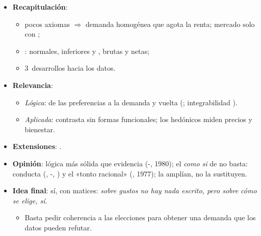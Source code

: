\documentclass{article}
\begin{document}
\begin{columnas}
\begin{itemize}
\item \textbf{Recapitulación}:
  \begin{itemize}
  \item pocos axiomas $\Rightarrow$ demanda homogénea que agota la renta; mercado solo con ;
  \item {}: normales, inferiores y , brutas y netas;
  \item 3~desarrollos hacia los datos.
  \end{itemize}
\item \textbf{Relevancia}:
  \begin{itemize}
  \item \emph{Lógica}: de las preferencias a la demanda y vuelta (; integrabilidad ).
  \item \emph{Aplicada}:  contrasta sin formas funcionales; los hedónicos miden precios y bienestar.
  \end{itemize}
\item \textbf{Extensiones}:      .
\item \textbf{Opinión}: lógica más sólida que evidencia (-, 1980); el \emph{como si} de  no basta: conducta (, -, ) y el «tonto racional» (, 1977); la amplían, no la sustituyen.
\item \textbf{Idea final}: sí, con matices: \emph{sobre gustos no hay nada escrito, pero sobre cómo se elige, sí}.
  \begin{itemize}
  \item Basta pedir coherencia a las elecciones para obtener una demanda que los datos pueden refutar.
  \end{itemize}
\end{itemize}


\end{columnas}
\end{document}
